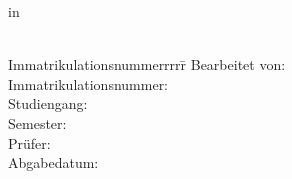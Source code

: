 \begin{titlepage}
	\begin{centering}
		\Large \textbf{\Institution}\\
		\Large \Programme \\
		\vfill
		\LARGE \textbf{\Title} \\
		\Subtitle \\
		\vfill
		\LARGE \AsssignmentName \\ %
		\Large in \\
		\LARGE  \Class \\
		\vfill
		\begin{small}
			\begin{doublespace}
				\begin{tabbing}
					Immatrikulationsnummerrrrr\=\kill
					Bearbeitet von:\>\Name\\
					Immatrikulationsnummer:\>\MatrikelNummer\\
					Studiengang:\>\Programme\\
					Semester:\>\Semester\\
					Prüfer:\>\Supervisor\\
					Abgabedatum:\>\Date
				\end{tabbing}
			\end{doublespace}
		\end{small}
		
	\end{centering}\vspace{1cm}
\end{titlepage}